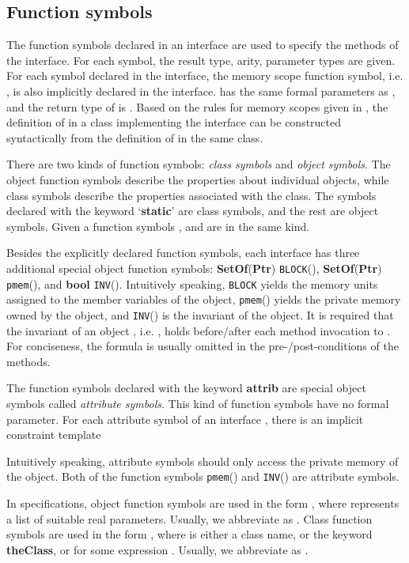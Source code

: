 \documentclass[fleqn]{llncs}
\begin{document}
\subsection{Function symbols}
The function symbols declared in an interface are used to specify the methods of the interface.
For each symbol, the result type, arity, parameter types are given.
For each symbol  declared in the interface, the memory scope function symbol, i.e. , is also implicitly declared in the interface.
 has the same formal parameters as , and the return type of  is .
Based on the rules for memory scopes given in \cite{DBLP:conf/ictac/ZhaoL13}, the definition of  in a class implementing the interface
can be constructed syntactically from the definition of  in the same class.

There are two kinds of function symbols: \emph{class symbols} and \emph{object symbols}.
The object function symbols describe the properties about individual objects, while class symbols
describe the properties associated with the class.
The symbols declared with the keyword `\textbf{static}' are class symbols, and the rest are object symbols.
Given a function symbols ,  and  are in the same kind.


Besides the explicitly declared function symbols, each interface has three additional special object function
symbols: \textbf{SetOf}(\textbf{Ptr}) \texttt{BLOCK}(), \textbf{SetOf}(\textbf{Ptr}) \texttt{pmem}(), and \textbf{bool} \texttt{INV}().
Intuitively speaking, \texttt{BLOCK} yields the memory units assigned to the member variables of the object,
\texttt{pmem}() yields the private memory owned by the object, and \texttt{INV}() is the invariant of the object.
It is required that the invariant of an object , i.e. , holds before/after each method invocation to .
For conciseness, the formula  is usually omitted in the pre-/post-conditions of the methods.

The function symbols declared with the keyword \textbf{attrib} are special object symbols called
\emph{attribute symbols}.
This kind of function symbols have no formal parameter. For each attribute symbol  of an interface , there is an implicit constraint template

Intuitively speaking, attribute symbols should only access the private memory of the object.
Both of the function symbols \texttt{pmem}() and \texttt{INV}() are attribute symbols.


In specifications, object function symbols are used in the form , where  represents a list of suitable real parameters.
Usually, we abbreviate  as .
Class function symbols are used in the form , where  is either a class name, or the keyword \textbf{theClass}, or  for some expression . Usually, we abbreviate  as
.
\end{document}
